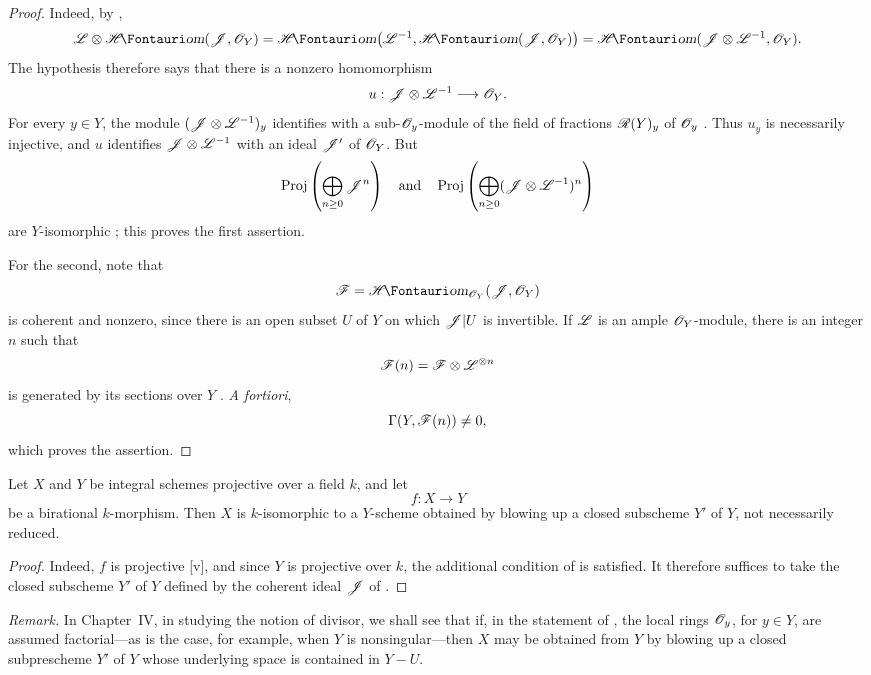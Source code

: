 \begin{proof}
Indeed, by ,
\[
  \sh{L}\otimes\shHom(\sh{J},\sh{O}_Y)
  =\shHom\bigl(\sh{L}^{-1},\shHom(\sh{J},\sh{O}_Y)\bigr)
  =\shHom(\sh{J}\otimes\sh{L}^{-1},\sh{O}_Y).
\]
The hypothesis therefore says that there is a nonzero homomorphism
\[
  u:\mathscr{J}\otimes\mathscr{L}^{-1}\longrightarrow\mathscr{O}_Y.
\]
For every $y\in Y$, the module $(\mathscr{J}\otimes\mathscr{L}^{-1})_y$ identifies with a sub-$\mathscr{O}_y$-module of the field of fractions $\mathscr{R}(Y)_y$ of $\mathscr{O}_y$ .
Thus $u_y$ is necessarily injective, and $u$ identifies $\mathscr{J}\otimes\mathscr{L}^{-1}$ with an ideal $\mathscr{J}'$ of $\mathscr{O}_Y$.
But
\[
  \operatorname{Proj}\left(\bigoplus_{n\geq0}\mathscr{J}^n\right)
  \quad\text{and}\quad
  \operatorname{Proj}\left(\bigoplus_{n\geq0}
  (\mathscr{J}\otimes\mathscr{L}^{-1})^n\right)
\]
are $Y$-isomorphic ; this proves the first assertion.

For the second, note that
\[
  \sh{F}=\shHom_{\sh{O}_Y}(\sh{J},\sh{O}_Y)
\]
is coherent and nonzero, since there is an open subset $U$ of $Y$ on which $\mathscr{J}|U$ is invertible.
If $\mathscr{L}$ is an ample $\mathscr{O}_Y$-module, there is an integer $n$ such that
\[
  \mathscr{F}(n)=\mathscr{F}\otimes\mathscr{L}^{\otimes n}
\]
is generated by its sections over $Y$ .
\emph{A fortiori},
\[
  \Gamma(Y,\mathscr{F}(n))\neq0,
\]
which proves the assertion.
\end{proof}

\begin{corollary}[2.3.7]
\label{III.2.3.7}
Let $X$ and $Y$ be integral schemes projective over a field $k$, and let
\[
  f:X\longrightarrow Y
\]
be a birational $k$-morphism.
Then $X$ is $k$-isomorphic to a $Y$-scheme obtained by blowing up a closed subscheme $Y'$ of $Y$, not necessarily reduced.
\end{corollary}

\begin{proof}
Indeed, $f$ is projective [v], and since $Y$ is projective over $k$, the additional condition of  is satisfied.
It therefore suffices to take the closed subscheme $Y'$ of $Y$ defined by the coherent ideal $\mathscr{J}$ of .
\end{proof}

\begin{env}[2.3.8]
\label{III.2.3.8}
\emph{Remark.}
In Chapter~IV, in studying the notion of divisor, we shall see that if, in the statement of , the local rings $\mathscr{O}_y$, for $y\in Y$, are assumed factorial---as is the case, for example, when $Y$ is nonsingular---then $X$ may be obtained from $Y$ by blowing up a closed subprescheme $Y'$ of $Y$ whose underlying space is contained in $Y-U$.
\end{env}


